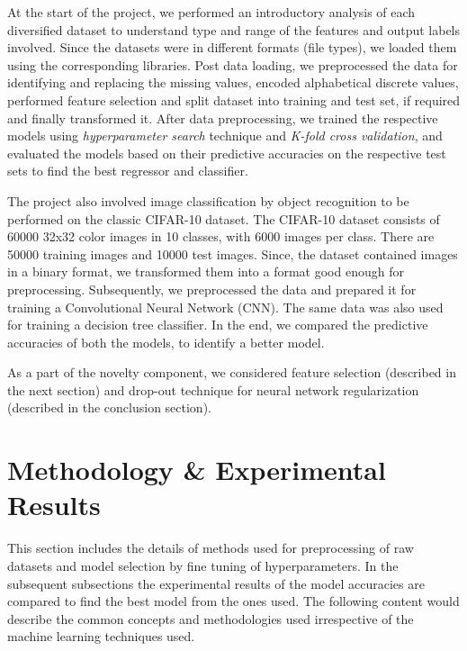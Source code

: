 \documentclass[10pt,twocolumn,letterpaper]{article}
\begin{document}
At the start of the project, we performed an introductory analysis of each
diversified dataset to understand type and range of the features and output
labels involved. Since the datasets were in different formats (file types), we
loaded them using the corresponding libraries. Post data loading, we
preprocessed the data for identifying and replacing the missing values, encoded
alphabetical discrete values, performed feature selection and split dataset into
training and test set, if required and finally transformed it. After data
preprocessing, we trained the respective models using \textit{hyperparameter search}
technique and \textit{K-fold cross validation}, and evaluated the models based on their
predictive accuracies on the respective test sets to find the best regressor and
classifier.

The project also involved image classification by object recognition to be
performed on the classic CIFAR-10 dataset. The CIFAR-10 dataset consists of
60000 32x32 color images in 10 classes, with 6000 images per class. There are
50000 training images and 10000 test images. Since, the dataset contained images
in a binary format, we transformed them into a format good enough for
preprocessing. Subsequently, we preprocessed the data and prepared it for
training a Convolutional Neural Network (CNN). The same data was also used for
training a decision tree classifier. In the end, we compared the predictive
accuracies of both the models, to identify a better model.

As a part of the novelty component, we considered feature selection (described in the next section) and drop-out technique for neural network regularization (described in the conclusion section).

\section{Methodology \& Experimental Results}

This section includes the details of methods used for preprocessing of raw
datasets and model selection by fine tuning of hyperparameters. In the
subsequent subsections the experimental results of the model accuracies are
compared to find the best model from the ones used.  The following content
would describe the common concepts and methodologies used irrespective of
the machine learning techniques used.
\end{document}

